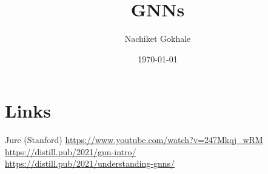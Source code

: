 \documentclass{article}
\begin{document}
\title{GNNs}
\author{Nachiket Gokhale}
\date{\today}
\maketitle
\section{Links}
Jure (Stanford) \url{https://www.youtube.com/watch?v=247Mkqj_wRM}\\
\url{https://distill.pub/2021/gnn-intro/}\\
\url{https://distill.pub/2021/understanding-gnns/}
\end{document}
